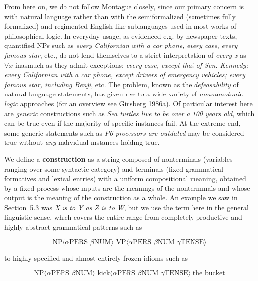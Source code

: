 From here on, we do not follow Montague closely, since our primary concern is
with natural language rather than with the semiformalized (sometimes fully
formalized) and regimented English-like sublanguages used in most works of
philosophical logic. In everyday usage, as evidenced e.g. by newspaper texts,
quantified NPs such as {\it every Californian with a car phone}, {\it every
  case}, {\it every famous star}, etc., do not lend themselves to a strict
interpretation of {\it every x} as $\forall x$ inasmuch as they admit
exceptions: {\it every case, except that of Sen.  Kennedy; every Californian
  with a car phone, except drivers of emergency vehicles; every famous star,
  including Benji}, etc. The problem, known as the {\it defeasability} of
natural language statements, has given rise to a wide variety of {\it
  nonmonotonic logic} approaches (for an overview see Ginsberg
1986a).\nocite{Ginsberg:1986a} Of particular interest here are {\it generic}
constructions  such as {\it Sea turtles live to be over a 100
  years old}, which can be true even if the majority of specific instances
fail. At the extreme end, some generic statements such as {\it P6 processors
  are outdated} may be considered true without {\it any} individual instances
holding true.

We define a {\bf construction}  as a string
composed of nonterminals (variables ranging over some syntactic category) and
terminals (fixed grammatical formatives and lexical entries) with a uniform
compositional meaning, obtained by a fixed process whose inputs are the
meanings of the nonterminals and whose output is the meaning of the
construction as a whole. An example we saw in Section~5.3 was {\it X is to Y
  as Z is to W}, but we use the term here in the general linguistic sense,
which covers the entire range from completely productive and highly abstract
grammatical patterns such as

\begin{equation} 
\text{NP$\langle$}\alpha\text{PERS } \beta\text{NUM$\rangle$  VP$\langle$}\alpha\text{PERS }
\beta\text{NUM } \gamma\text{TENSE$\rangle$}
\end{equation}

\noindent 
to highly specified and almost entirely frozen idioms such as 

\begin{equation} 
\text{NP$\langle$}\alpha\text{PERS } \beta\text{NUM$\rangle$ kick$\langle$}\alpha\text{PERS }
\beta\text{NUM } \gamma\text{TENSE$\rangle$ the bucket}
\end{equation}

